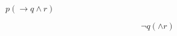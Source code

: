 \documentclass[a4paper]{article}
\begin{document}
\maketitle \newpage

$p (\to q \land r)$


\[
	\lnot q( \land r)
\]
\end{document}
